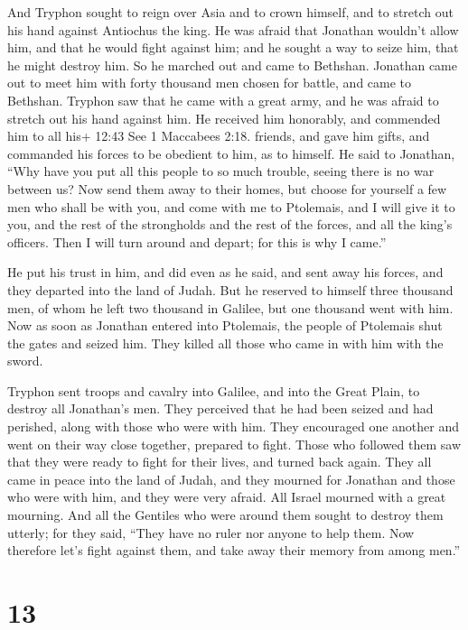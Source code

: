  And Tryphon sought to reign over Asia and to crown
himself, and to stretch out his hand against Antiochus the king.
 He was afraid that Jonathan wouldn't allow him, and that
he would fight against him; and he sought a way to seize him, that he
might destroy him. So he marched out and came to Bethshan. 
Jonathan came out to meet him with forty thousand men chosen for battle,
and came to Bethshan.  Tryphon saw that he came with a
great army, and he was afraid to stretch out his hand against him.
 He received him honorably, and commended him to all his+
12:43 See 1 Maccabees 2:18. friends, and gave him gifts, and commanded
his forces to be obedient to him, as to himself.  He said
to Jonathan, ``Why have you put all this people to so much trouble,
seeing there is no war between us?  Now send them away to
their homes, but choose for yourself a few men who shall be with you,
and come with me to Ptolemais, and I will give it to you, and the rest
of the strongholds and the rest of the forces, and all the king's
officers. Then I will turn around and depart; for this is why I came.''

 He put his trust in him, and did even as he said, and sent
away his forces, and they departed into the land of Judah. 
But he reserved to himself three thousand men, of whom he left two
thousand in Galilee, but one thousand went with him.  Now
as soon as Jonathan entered into Ptolemais, the people of Ptolemais shut
the gates and seized him. They killed all those who came in with him
with the sword.

 Tryphon sent troops and cavalry into Galilee, and into the
Great Plain, to destroy all Jonathan's men.  They perceived
that he had been seized and had perished, along with those who were with
him. They encouraged one another and went on their way close together,
prepared to fight.  Those who followed them saw that they
were ready to fight for their lives, and turned back again.
 They all came in peace into the land of Judah, and they
mourned for Jonathan and those who were with him, and they were very
afraid. All Israel mourned with a great mourning.  And all
the Gentiles who were around them sought to destroy them utterly; for
they said, ``They have no ruler nor anyone to help them. Now therefore
let's fight against them, and take away their memory from among men.''

\hypertarget{section-12}{%
\section{13}\label{section-12}}

